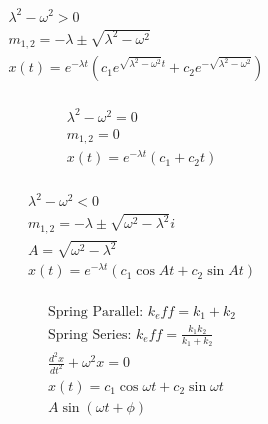 \documentclass[12pt]{article}
\begin{document}
\begin{multicols}{2}

  \begin{equation}
    \begin{split}
      \lambda^2-\omega^2>0&\\
      m_{1,2}=-\lambda \pm\sqrt{\lambda^2-\omega^2}\\
      x(t)=e^{-\lambda t}\left(c_1e^{\sqrt{\lambda^2-\omega^2}t}+c_2e^{-\sqrt{\lambda^2-\omega^2}} \right)\\
    \end{split}
    \label{7}
  \end{equation}

  \begin{equation}
    \begin{split}
     \lambda^2-\omega^2=0\\
      m_{1,2}=0\\
      x(t)=e^{-\lambda t}(c_1+c_2t)\\
    \end{split}
    \label{8}
  \end{equation}


\end{multicols}

\begin{multicols}{2}

  \begin{equation}
    \begin{split}
      \lambda^2-\omega^2<0\\
      m_{1,2}=-\lambda \pm\sqrt{\omega^2-\lambda^2}i\\
      A=\sqrt{\omega^2-\lambda^2}\\
      x(t)=e^{-\lambda t}\left(c_1\cos At+c_2\sin At\right)\\
    \end{split}
    \label{9}
  \end{equation}

  \begin{equation}
    \begin{split}
      \text{Spring Parallel: } k_eff=k_1+k_2\\
      \text{Spring Series: } k_eff=\frac{k_1k_2}{k_1+k_2}\\
    \frac{d^2x}{dt^2}+\omega^2x=0\\
    x(t)=c_1\cos\omega t+ c_2\sin\omega t\\
    A\sin(\omega t+\phi)
    \end{split}
    \label{10}
  \end{equation}

\end{multicols}
\end{document}
